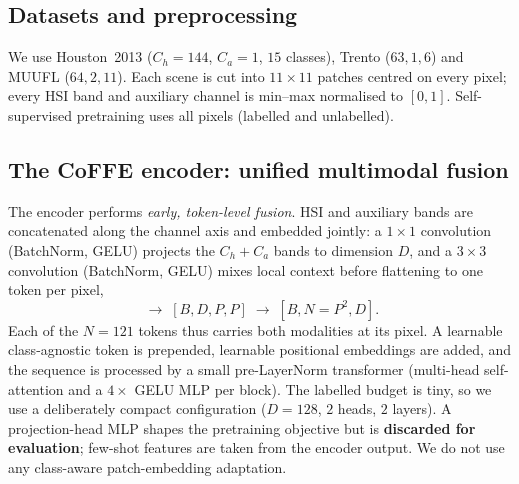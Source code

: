\subsection{Datasets and preprocessing}
\label{subsec:data}
We use Houston~2013 ($C_h{=}144$, $C_a{=}1$, $15$ classes), Trento ($63,1,6$) and
MUUFL ($64,2,11$). Each scene is cut into $11\times11$ patches centred on every
pixel; every HSI band and auxiliary channel is min--max normalised to $[0,1]$.
Self-supervised pretraining uses all pixels (labelled and unlabelled).

\subsection{The CoFFE encoder: unified multimodal fusion}
\label{subsec:encoder}
The encoder performs \emph{early, token-level fusion}. HSI and auxiliary bands are
concatenated along the channel axis and embedded jointly: a $1{\times}1$
convolution (BatchNorm, GELU) projects the $C_h{+}C_a$ bands to dimension $D$, and
a $3{\times}3$ convolution (BatchNorm, GELU) mixes local context before flattening
to one token per pixel,
\begin{equation}
  [B, C_h{+}C_a, P, P] \;\rightarrow\; [B, D, P, P] \;\rightarrow\;
  [B, N{=}P^2, D].
\end{equation}
Each of the $N{=}121$ tokens thus carries both modalities at its pixel. A learnable
class-agnostic token is prepended, learnable positional embeddings are added, and
the sequence is processed by a small pre-LayerNorm transformer (multi-head
self-attention and a $4\times$ GELU MLP per block). The labelled budget is tiny, so
we use a deliberately compact configuration ($D{=}128$, $2$ heads, $2$ layers). A
projection-head MLP shapes the pretraining objective but is \textbf{discarded for
evaluation}; few-shot features are taken from the encoder output. We do not use any
class-aware patch-embedding adaptation.


